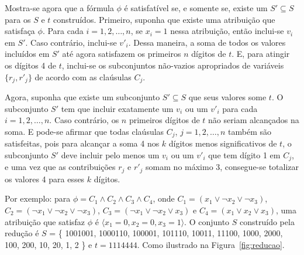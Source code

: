 Mostra-se agora que a fórmula $\phi$ é satisfatível se, e somente se, existe um $S' \subseteq S$ para os $S$ e $t$ construídos. Primeiro, suponha que existe uma atribuição que satisfaça $\phi$. Para cada $i = 1, 2, \dots, n$, se $x_i = 1$ nessa atribuição, então inclui-se $v_i$ em $S'$. Caso contrário, inclui-se $v'_i$. Dessa maneira, a soma de todos os valores incluídos em $S'$ até agora satisfazem os primeiros $n$ dígitos de $t$. E, para atingir os dígitos 4 de $t$, inclui-se os subconjuntos não-vazios apropriados de variáveis $\{r_j, r'_j\}$ de acordo com as claúsulas $C_j$.

Agora, suponha que existe um subconjunto $S' \subseteq S$ que seus valores some $t$. O subconjunto $S'$ tem que incluir exatamente um $v_i$ ou um $v'_i$ para cada $i = 1, 2, \dots, n$. Caso contrário, os $n$ primeiros dígitos de $t$ não seriam alcançados na soma. E pode-se afirmar que todas claúsulas $C_j$, $j = 1, 2, \dots, n$ também são satisfeitas, pois para alcançar a soma 4 nos $k$ dígitos menos significativos de $t$, o subconjunto $S'$ deve incluir pelo menos um $v_i$ ou um $v'_i$ que tem dígito 1 em $C_j$, e uma vez que as contribuições $r_j$ e $r'_j$ somam no máximo 3, consegue-se totalizar os valores 4 para esses $k$ dígitos.

\newpage
Por exemplo: para $\phi = C_1 \land C_2 \land C_3 \land C_4$, onde $C_1 = (x_1 \lor \lnot x_2 \lor \lnot x_3)$, $C_2 = (\lnot x_1 \lor \lnot x_2 \lor \lnot x_3)$, $C_3 = (\lnot x_1 \lor \lnot x_2 \lor x_3)$ e $C_4 = (x_1 \lor x_2 \lor x_3)$, uma atribuição que satisfaz $\phi$ é $\langle x_1 = 0, x_2 = 0, x_3 = 1 \rangle$. O conjunto $S$ construído pela redução é $S$ = \{ 1001001, 1000110, 100001, 101110, 10011, 11100, 1000, 2000, 100, 200, 10, 20, 1, 2 \} e $t = 1114444$. Como ilustrado na Figura~\ref{fig:reducao}.

